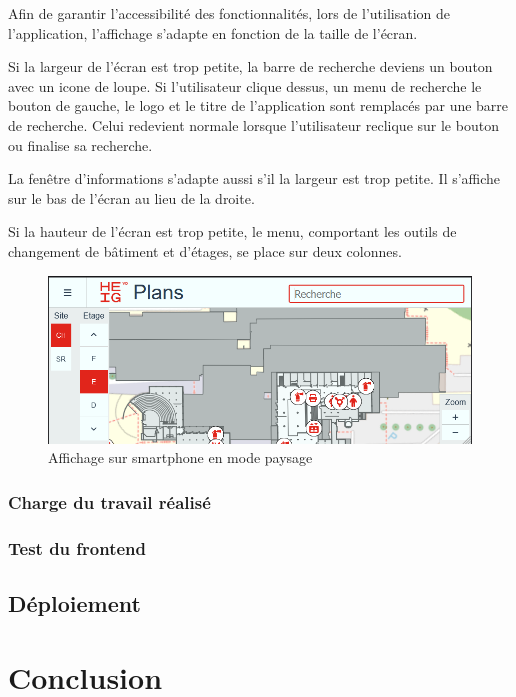 \documentclass[
    iai, %
    il, %
]{heig-tb}
\begin{document}
Afin de garantir l'accessibilité des fonctionnalités, lors de l'utilisation de l'application,
l'affichage s'adapte en fonction de la taille de l'écran.

Si la largeur de l'écran est trop petite, la barre de recherche deviens un bouton avec un icone de loupe.
Si l'utilisateur clique dessus, un menu de recherche le bouton de gauche, le logo et le titre de l'application
sont remplacés par une barre de recherche.
Celui redevient normale lorsque l'utilisateur reclique sur le bouton ou finalise sa recherche.

La fenêtre d'informations s'adapte aussi s'il la largeur est trop petite.
Il s'affiche sur le bas de l'écran au lieu de la droite.

Si la hauteur de l'écran est trop petite, le menu, comportant les outils de changement de bâtiment et d'étages,
se place sur deux colonnes.

\begin{figure}[h]
    \centering
    \includegraphics[scale=0.5]{frontend-responsive-paysage.png}
    \caption{Affichage sur smartphone en mode paysage}
\end{figure}

\subsection{Charge du travail réalisé}

\subsection{Test du frontend}

\section{Déploiement}

\chapter{Conclusion}
\end{document}
